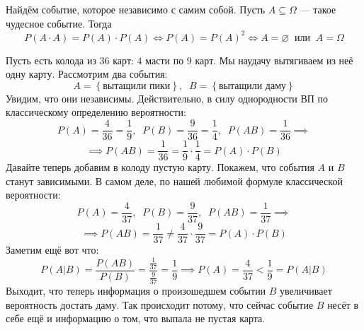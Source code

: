 \documentclass[11pt]{article}
\begin{document}
\begin{example}
    Найдём событие, которое независимо с самим собой. Пусть $A \subseteq \Omega$ --- такое чудесное событие. Тогда
    \[P(A \cdot A) = P(A) \cdot P(A) \iff P(A) = P(A)^2 \iff A = \varnothing \; \; \text{или} \; \; A = \Omega\]
\end{example}

\begin{example} \label{ex:1.2}
    Пусть есть колода из $36$ карт: $4$ масти по $9$ карт. Мы наудачу вытягиваем из неё одну карту. Рассмотрим два события:
    \[A =\left\{\text{вытащили пики}\right\}, \; \; B = \left\{\text{вытащили даму}\right\}\]
    Увидим, что они независимы. Действительно, в силу однородности ВП по классическому определению вероятности:
    \[P(A) = \frac{4}{36} = \frac{1}{9}, \; \; P(B) = \frac{9}{36} = \frac{1}{4}, \; \; P(AB) = \frac{1}{36} \implies\]
    \[\implies P(AB) = \frac{1}{36} = \frac{1}{9} \cdot \frac{1}{4} = P(A) \cdot P(B)\]
    Давайте теперь добавим в колоду пустую карту. Покажем, что события $A$ и $B$ станут зависимыми. В самом деле, по нашей любимой формуле классической вероятности:
    \[P(A) = \frac{4}{37}, \; \; P(B) = \frac{9}{37}, \; \; P(AB) = \frac{1}{37} \implies\]
    \[\implies P(AB) = \frac{1}{37} \neq \frac{4}{37} \cdot \frac{9}{37} = P(A) \cdot P(B)\]
    Заметим ещё вот что:
    \[P(A | B) = \frac{P(AB)}{P(B)} = \frac{\frac{1}{37}}{\frac{9}{37}} = \frac{1}{9} \implies P(A) = \frac{4}{37} < \frac{1}{9} = P(A | B)\]
    Выходит, что теперь информация о произошедшем событии $B$ увеличивает вероятность достать даму. Так происходит потому, что сейчас событие $B$ несёт в себе ещё и информацию о том, что выпала не пустая карта.
\end{example}
\end{document}
